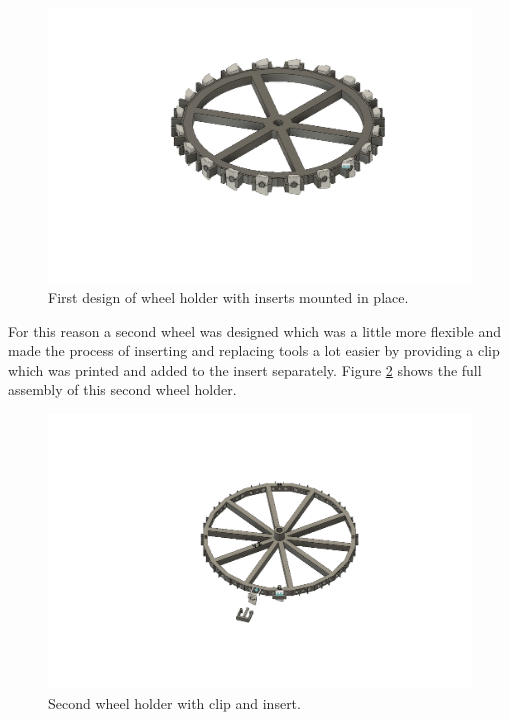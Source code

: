 		
		\begin{figure}[hbtp]
		\centering
		\includegraphics[scale=0.3]{fig/Camera_setup/Tool_Holder/Wheel_Holder/first_wheel_holder/radhouderV1_model_inserts.png}
		\caption{First design of wheel holder with inserts mounted in place.}
		\label{fig:setup:wheelholder1:inserts}
		\end{figure}
		
		For this reason a second wheel was designed which was a little more flexible and made the process of inserting and replacing tools a lot easier by providing a clip which was printed and added to the insert separately. Figure \ref{fig:setup:wheelholder2:inserts} shows the full assembly of this second wheel holder. 
		
		
		\begin{figure}[hbtp]
		\centering
		\includegraphics[scale=0.3]{fig/Camera_setup/Tool_Holder/Wheel_Holder/Second_Wheel_Holder/radhouder_v2_assembly.png}
		\caption{Second wheel holder with clip and insert.}
		\label{fig:setup:wheelholder2:inserts}
		\end{figure}
		
